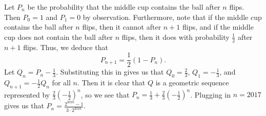 Let $P_n$ be the probability that the middle cup contains the ball after $n$ flips. Then $P_0=1$ and $P_1=0$ by observation. Furthermore, note that if the middle cup contains the ball after $n$ flips, then it cannot after $n+1$ flips, and if the middle cup does not contain the ball after $n$ flips, then it does with probability $\frac{1}{2}$ after $n+1$ flips. Thus, we deduce that \[P_{n+1}=\frac{1}{2}\left(1-P_n\right).\] Let $Q_n=P_n-\frac{1}{3}$. Substituting this in gives us that $Q_0=\frac{2}{3}$, $Q_1=-\frac{1}{3}$, and $Q_{n+1}=-\frac{1}{2}Q_n$ for all $n$. Then it is clear that $Q$ is a geometric sequence represented by $\frac{2}{3}\left(-\frac{1}{2}\right)^n$, so we see that $P_n=\frac{1}{3}+\frac{2}{3}\left(-\frac{1}{2}\right)^n$. Plugging in $n=2017$ gives us that $P_n=\boxed{\frac{2^{2016}-1}{3\cdot2^{2016}}}$.